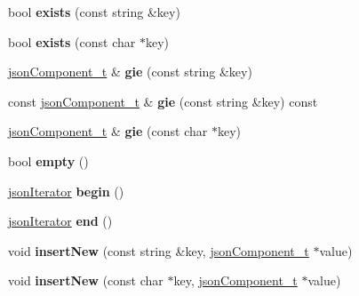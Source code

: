 \begin{DoxyCompactItemize}
\item 
\hypertarget{classjsonObj__t_a431041cd55b2ac0960adbe442f48fb43}{bool {\bfseries exists} (const string \&key)}\label{classjsonObj__t_a431041cd55b2ac0960adbe442f48fb43}

\item 
\hypertarget{classjsonObj__t_aee45e8918539bb82ece6be1749a2dfc5}{bool {\bfseries exists} (const char $\ast$key)}\label{classjsonObj__t_aee45e8918539bb82ece6be1749a2dfc5}

\item 
\hypertarget{classjsonObj__t_a1a55cfdcd8df8121b2413560ac04a4cf}{\hyperlink{classjsonComponent__t}{json\-Component\-\_\-t} \& {\bfseries gie} (const string \&key)}\label{classjsonObj__t_a1a55cfdcd8df8121b2413560ac04a4cf}

\item 
\hypertarget{classjsonObj__t_a7a6c1ac64efc8e61bd844987fd86d6eb}{const \hyperlink{classjsonComponent__t}{json\-Component\-\_\-t} \& {\bfseries gie} (const string \&key) const }\label{classjsonObj__t_a7a6c1ac64efc8e61bd844987fd86d6eb}

\item 
\hypertarget{classjsonObj__t_aa4a8271060e0314dec009f4ad21532a7}{\hyperlink{classjsonComponent__t}{json\-Component\-\_\-t} \& {\bfseries gie} (const char $\ast$key)}\label{classjsonObj__t_aa4a8271060e0314dec009f4ad21532a7}

\item 
\hypertarget{classjsonObj__t_aaea6c299117ecfe23417c09e888576aa}{bool {\bfseries empty} ()}\label{classjsonObj__t_aaea6c299117ecfe23417c09e888576aa}

\item 
\hypertarget{classjsonObj__t_a9a80daa50c4d679443422452f88cfa10}{\hyperlink{classjsonIterator}{json\-Iterator} {\bfseries begin} ()}\label{classjsonObj__t_a9a80daa50c4d679443422452f88cfa10}

\item 
\hypertarget{classjsonObj__t_aac1238a8f98a5f666a187722ac88d3ca}{\hyperlink{classjsonIterator}{json\-Iterator} {\bfseries end} ()}\label{classjsonObj__t_aac1238a8f98a5f666a187722ac88d3ca}

\item 
\hypertarget{classjsonObj__t_a99d10dd011eae4fbde95c081827ddde3}{void {\bfseries insert\-New} (const string \&key, \hyperlink{classjsonComponent__t}{json\-Component\-\_\-t} $\ast$value)}\label{classjsonObj__t_a99d10dd011eae4fbde95c081827ddde3}

\item 
\hypertarget{classjsonObj__t_a8646ae12fd9cdc75221a8dcf61e82bba}{void {\bfseries insert\-New} (const char $\ast$key, \hyperlink{classjsonComponent__t}{json\-Component\-\_\-t} $\ast$value)}\label{classjsonObj__t_a8646ae12fd9cdc75221a8dcf61e82bba}


\end{DoxyCompactItemize}
